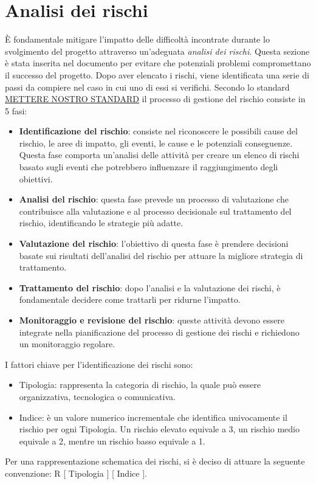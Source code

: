 \section{Analisi dei rischi}
È fondamentale mitigare l'impatto delle difficoltà incontrate durante lo svolgimento del progetto attraverso un'adeguata \textit{analisi dei rischi}. Questa sezione è stata inserita nel documento per evitare che potenziali problemi compromettano il successo del progetto.
Dopo aver elencato i rischi, viene identificata una serie di passi da compiere nel caso in cui uno di essi si verifichi. Secondo lo standard \uline{METTERE NOSTRO STANDARD} il processo di gestione del rischio consiste in 5 fasi:
\begin{itemize}
    \item \textbf{Identificazione del rischio}: consiste nel riconoscere le possibili cause del rischio, le aree di impatto, gli eventi, le cause e le potenziali conseguenze. Questa fase comporta un'analisi delle attività per creare un elenco di rischi basato sugli eventi che potrebbero influenzare il raggiungimento degli obiettivi.

    \item \textbf{Analisi del rischio}: questa fase prevede un processo di valutazione che contribuisce alla valutazione e al processo decisionale sul trattamento del rischio, identificando le strategie più adatte.

    \item \textbf{Valutazione del rischio}: l'obiettivo di questa fase è prendere decisioni basate sui risultati dell'analisi del rischio per attuare la migliore strategia di trattamento.
    
    \item \textbf{Trattamento del rischio}: dopo l'analisi e la valutazione dei rischi, è fondamentale decidere come trattarli per ridurne l'impatto.
    
    \item \textbf{Monitoraggio e revisione del rischio}: queste attività devono essere integrate nella pianificazione del processo di gestione dei rischi e richiedono un monitoraggio regolare.
    
\end{itemize}
I fattori chiave per l'identificazione dei rischi sono:
\begin{itemize}
    \item Tipologia: rappresenta la categoria di rischio, la quale può essere organizzativa, tecnologica o comunicativa.
    \item Indice: è un valore numerico incrementale che identifica univocamente il rischio per ogni Tipologia. Un rischio elevato equivale a 3, un rischio medio equivale a 2, mentre un rischio basso equivale a 1.
\end{itemize}
Per una rappresentazione schematica dei rischi, si è deciso di attuare la seguente convenzione: R [ Tipologia ] [ Indice ].

